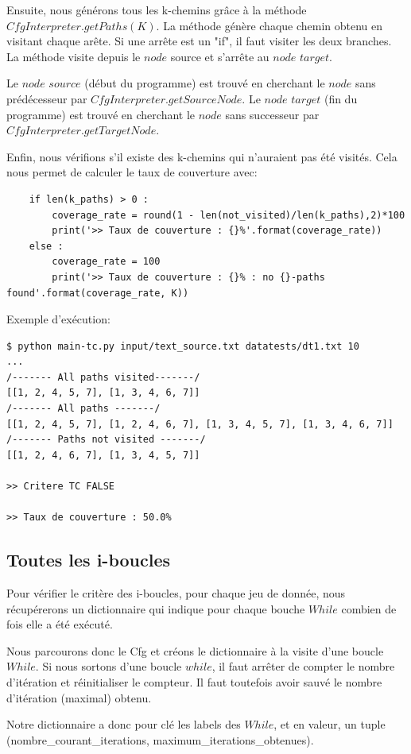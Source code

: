 \documentclass[a4paper]{article}
\begin{document}
Ensuite, nous générons tous les k-chemins grâce à la méthode $CfgInterpreter.getPaths(K)$. La méthode génère chaque chemin obtenu en visitant chaque arête. Si une arrête est un "if", il faut visiter les deux branches. La méthode visite depuis le $node$ source et s'arrête au $node$ $target$.

Le $node$ $source$ (début du programme) est trouvé en cherchant le $node$ sans prédécesseur par $CfgInterpreter.getSourceNode$.
Le $node$ $target$ (fin du programme) est trouvé en cherchant le $node$ sans successeur par $CfgInterpreter.getTargetNode$.

Enfin, nous vérifions s'il existe des k-chemins qui n'auraient pas été visités. Cela nous permet de calculer le taux de couverture avec:
\begin{verbatim}
    if len(k_paths) > 0 :
        coverage_rate = round(1 - len(not_visited)/len(k_paths),2)*100
        print('>> Taux de couverture : {}%'.format(coverage_rate))
    else :
        coverage_rate = 100
        print('>> Taux de couverture : {}% : no {}-paths found'.format(coverage_rate, K))
\end{verbatim}

Exemple d'exécution:
\begin{verbatim}
$ python main-tc.py input/text_source.txt datatests/dt1.txt 10
...
/------- All paths visited-------/
[[1, 2, 4, 5, 7], [1, 3, 4, 6, 7]]
/------- All paths -------/
[[1, 2, 4, 5, 7], [1, 2, 4, 6, 7], [1, 3, 4, 5, 7], [1, 3, 4, 6, 7]]
/------- Paths not visited -------/
[[1, 2, 4, 6, 7], [1, 3, 4, 5, 7]]

>> Critere TC FALSE

>> Taux de couverture : 50.0%
\end{verbatim}

\subsection{Toutes les i-boucles}

Pour vérifier le critère des i-boucles, pour chaque jeu de donnée, nous récupérerons un dictionnaire qui indique pour chaque bouche $While$ combien de fois elle a été exécuté.

Nous parcourons donc le Cfg et créons le dictionnaire à la visite d'une boucle $While$. Si nous sortons d'une boucle $while$, il faut arrêter de compter le nombre d'itération et réinitialiser le compteur. Il faut toutefois avoir sauvé le nombre d'itération (maximal) obtenu.

Notre dictionnaire a donc pour clé les labels des $While$, et en valeur, un tuple (nombre\_courant\_iterations, maximum\_iterations\_obtenues). 
\end{document}
